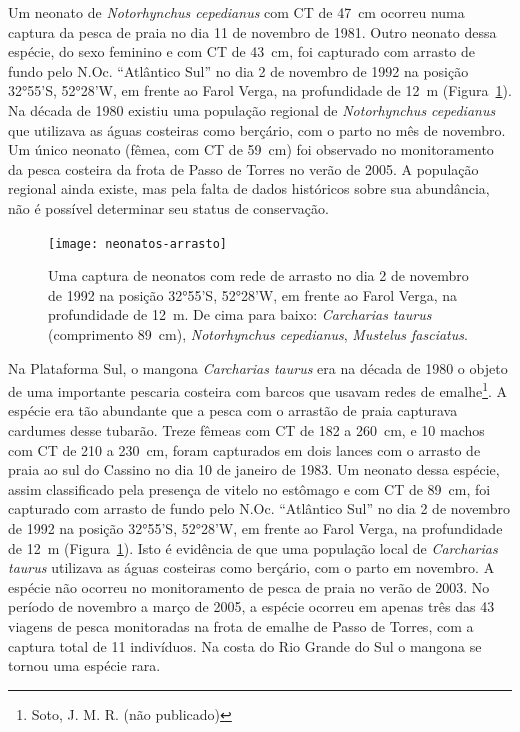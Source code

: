 \documentclass[a4paper,11pt,twoside,showtrims,onecolumn,openright,final]{memoir}
\begin{document}
Um neonato de \emph{Notorhynchus cepedianus} com CT de 47~cm ocorreu numa captura da pesca de praia 
no dia 11 de novembro de 1981. Outro neonato dessa espécie, do sexo feminino e com CT de 43~cm, 
foi capturado com arrasto de fundo pelo N.Oc. ``Atlântico Sul'' no dia 2 de novembro de 1992 
na posição 32°55'S, 52°28'W, em frente ao Farol Verga, na profundidade de 12~m (Figura~\ref{fig:elasmos-fig1}). %
Na década de 1980 existiu uma população regional de \emph{Notorhynchus cepedianus} que utilizava 
as águas costeiras como berçário, com o parto no mês de novembro. Um único neonato (fêmea, com CT de 59~cm) 
foi observado no monitoramento da pesca costeira da frota de Passo de Torres no verão de 2005. 
A população regional ainda existe, mas pela falta de dados históricos sobre sua abundância, não é possível 
determinar seu status de conservação.

%
%

\begin{figure}
\begin{center}
\texttt{[image: neonatos-arrasto]}
\end{center}
\caption[Captura de neonatos com rede de arrasto]
	{Uma captura de neonatos com rede de arrasto no dia 2 de novembro de 1992 na 
         posição 32°55'S, 52°28'W, em frente ao Farol Verga, na profundidade de 12~m. 
         De cima para baixo: \emph{Carcharias taurus} (comprimento 89~cm), \emph{Notorhynchus cepedianus}, \emph{Mustelus fasciatus}.}
\label{fig:elasmos-fig1}
\end{figure}



Na Plataforma Sul, o mangona \emph{Carcharias taurus} era na década de 1980 o objeto de uma importante 
pescaria costeira com barcos que usavam redes de emalhe\footnote{Soto, J. M. R. (não publicado)}.
A espécie era tão abundante que a pesca com o arrastão de praia capturava cardumes desse tubarão.
Treze fêmeas com CT de 182 a 260~cm, e 10 machos com CT de 210 a 230~cm, foram capturados em dois lances 
com o arrasto de praia ao sul do Cassino no dia 10 de janeiro de 1983. Um neonato dessa espécie, 
assim classificado pela presença de vitelo no estômago e com CT de 89~cm, foi capturado com arrasto de 
fundo pelo N.Oc. ``Atlântico Sul'' no dia 2 de novembro de 1992 na posição 32°55'S, 52°28'W, em 
frente ao Farol Verga, na profundidade de 12~m (Figura~\ref{fig:elasmos-fig1}). %
Isto é evidência de que uma população local de \emph{Carcharias taurus} utilizava as águas costeiras como 
berçário, com o parto em novembro. A espécie não ocorreu no monitoramento de pesca de praia 
no verão de 2003. No período de novembro a março de 2005, a espécie ocorreu em apenas três 
das 43 viagens de pesca monitoradas na frota de emalhe de Passo de Torres, com a captura total 
de 11 indivíduos. Na costa do Rio Grande do Sul o mangona se tornou uma espécie rara.
\end{document}
